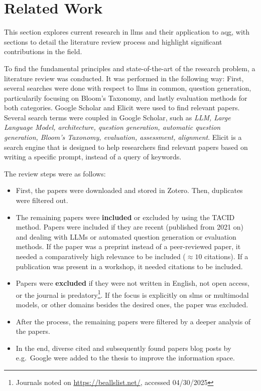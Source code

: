 \section{Related Work} \label{sec:related-work}

This section explores current research in \ac{llms} and their application to \ac{aqg}, with sections to detail the literature review process and highlight significant contributions in the field.


 To find the fundamental principles and state-of-the-art of the research problem, a literature review was conducted. It was performed in the following way: First, several searches were done with respect to \ac{llms} in common, question generation, particularily focusing on Bloom's Taxonomy, and lastly evaluation methods for both categories. Google Scholar and Elicit were used to find relevant papers. Several search terms were coupled in Google Scholar, such as \textit{LLM, Large Language Model, architecture, question generation, automatic question generation, Bloom's Taxonomy, evaluation, assessment, alignment}. Elicit is a search engine that is designed to help researchers find relevant papers based on writing a specific prompt, instead of a query of keywords.

 The review steps were as follows: 
\begin{itemize}
    \item First, the papers were downloaded and stored in Zotero. Then, duplicates were filtered out.
    \item The remaining papers were \textbf{included} or excluded by using the TACID method. Papers were included if they are recent (published from 2021 on) and dealing with LLMs or automated question generation or evaluation methods. If the paper was a preprint instead of a peer-reviewed paper, it needed a comparatively high relevance to be included ($\approx 10$ citations). If a publication was present in a workshop, it needed citations to be included.
    \item Papers were \textbf{excluded} if they were not written in English, not open access, or the journal is predatory\footnote{Journals noted on \url{https://beallslist.net/}, accessed 04/30/2025}. If the focus is explicitly on \ac{slms} or multimodal models, or other domains besides the desired ones, the paper was excluded. 
    \item After the process, the remaining papers were filtered by a deeper analysis of the papers.
    \item In the end, diverse cited and subsequently found papers blog posts by e.g.\ Google were added to the thesis to improve the information space.
\end{itemize}

